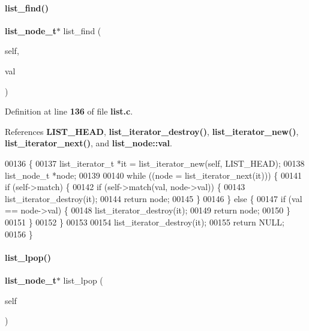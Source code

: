 \paragraph{list\+\_\+find()}
{\footnotesize\ttfamily \textbf{ list\+\_\+node\+\_\+t}$\ast$ list\+\_\+find (\begin{DoxyParamCaption}\item[{\textbf{ list\+\_\+t} $\ast$}]{self,  }\item[{void $\ast$}]{val }\end{DoxyParamCaption})}



Definition at line \textbf{ 136} of file \textbf{ list.\+c}.



References \textbf{ L\+I\+S\+T\+\_\+\+H\+E\+AD}, \textbf{ list\+\_\+iterator\+\_\+destroy()}, \textbf{ list\+\_\+iterator\+\_\+new()}, \textbf{ list\+\_\+iterator\+\_\+next()}, and \textbf{ list\+\_\+node\+::val}.


\begin{DoxyCode}
00136                                                 \{
00137   list_iterator_t *it = list_iterator_new(\textcolor{keyword}{self}, LIST_HEAD);
00138   list_node_t *node;
00139 
00140   \textcolor{keywordflow}{while} ((node = list_iterator_next(it))) \{
00141     \textcolor{keywordflow}{if} (self->match) \{
00142       \textcolor{keywordflow}{if} (self->match(val, node->val)) \{
00143         list_iterator_destroy(it);
00144         \textcolor{keywordflow}{return} node;
00145       \}
00146     \} \textcolor{keywordflow}{else} \{
00147       \textcolor{keywordflow}{if} (val == node->val) \{
00148         list_iterator_destroy(it);
00149         \textcolor{keywordflow}{return} node;
00150       \}
00151     \}
00152   \}
00153 
00154   list_iterator_destroy(it);
00155   \textcolor{keywordflow}{return} NULL;
00156 \}
\end{DoxyCode}
\mbox{\label{a00110_a97f6f9590b1cdedd5367b9139e9cc4ef}} 
\paragraph{list\+\_\+lpop()}
{\footnotesize\ttfamily \textbf{ list\+\_\+node\+\_\+t}$\ast$ list\+\_\+lpop (\begin{DoxyParamCaption}\item[{\textbf{ list\+\_\+t} $\ast$}]{self }\end{DoxyParamCaption})}




